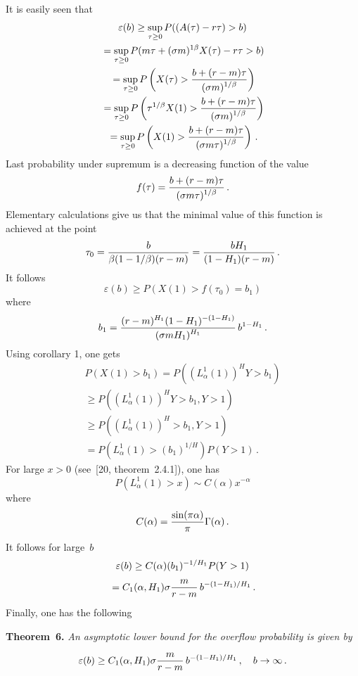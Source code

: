 \begin{multicols}{2}
It is easily seen that 
\begin{multline*}
\varepsilon (b) \geq 
\sup\limits_{\tau\geq 0} P( (A(\tau ) - r\tau ) > b ) \\
{}=
\sup\limits_{\tau\geq 0} P( m\tau +(\sigma m )^{1\/\beta} X(\tau ) - r\tau  > b )\\
{}=
\sup\limits_{\tau\geq 0} P\left( X(\tau ) > 
\displaystyle\frac{\displaystyle b+(r-m)\tau\mathstrut}{\displaystyle (\sigma m)^{1/\beta}\mathstrut}\right ) \\
{}=
\sup\limits_{\tau\geq 0} P\left( \tau^{1/\beta} X(1) > 
\displaystyle\frac{\displaystyle b+(r-m)\tau\mathstrut}{\displaystyle (\sigma m)^{1/\beta}\mathstrut}\right ) \\
{}=
\sup\limits_{\tau\geq 0} P\left( X(1) > 
\displaystyle\frac{\displaystyle b+(r-m)\tau\mathstrut}{\displaystyle (\sigma m \tau )^{1/\beta}\mathstrut}\right ) \,. 
\end{multline*}
Last probability under supremum is a decreasing function of the value 
$$
f(\tau ) = \displaystyle\frac{\displaystyle b+(r-m)\tau\mathstrut}{\displaystyle (\sigma m \tau )^{1/\beta}\mathstrut}\,.
$$
Elementary calculations give us that the minimal value of this function is achieved at the 
point 
$$
\tau_0 = \displaystyle\frac{\displaystyle b\mathstrut}{\displaystyle \beta (1-1/\beta )(r-m)\mathstrut} = \displaystyle\frac{\displaystyle b H_1\mathstrut}{\displaystyle (1-H_1 ) (r-m)\mathstrut} \,. 
$$
It follows 
$$
\varepsilon (b) \geq P(X(1) > f(\tau_0 ) = b_1 ) 
$$ 
where 
$$
b_1 = \displaystyle\frac{\displaystyle (r-m)^{H_1} (1-H_1 )^{-(1-H_1 )} \mathstrut}{\displaystyle (\sigma m H_1 )^{H_1 } \mathstrut} \, b^{1-H_1} \,. 
$$
Using corollary 1, one gets 
\begin{multline*}
P(X(1) > b_1 ) = P((L_{\alpha}^1 (1))^H Y >b_1 ) \\
{}\geq  
P((L_{\alpha}^1 (1))^H Y >b_1 , Y>1) \\
{}\geq
P((L_{\alpha}^1 (1))^H >b_1 , Y>1)\\ = P(L_{\alpha}^1 (1) 
>(b_1 )^{1/H} ) P(Y>1) \,. 
\end{multline*}
For large $x>0$ (see~[20, theorem~2.4.1]), one has 
$$
 P(L_{\alpha}^1 (1) > x ) \sim C(\alpha ) x^{-\alpha} 
$$
where 
$$
C(\alpha ) = \displaystyle\frac{\displaystyle \sin (\pi\alpha )\mathstrut}{\displaystyle \pi\mathstrut} \Gamma (\alpha )\,.
$$
It follows for large~$b$ 
\begin{multline*}
\varepsilon (b) \geq C(\alpha ) (b_1 )^{-1/H_1} P(Y>1)\\
{}=
C_1 (\alpha , H_1 )\sigma \displaystyle\frac{\displaystyle m\mathstrut}{\displaystyle r-m\mathstrut} \, b^{-({1-H_1})/H_1} \,.
\end{multline*}
Finally, one has the following 

\pagebreak

\smallskip

\noindent
\textbf{Theorem~6.} \textit{An asymptotic lower bound for the overflow probability is given by}
$$
\varepsilon (b) \geq
C_1 (\alpha , H_1 )\sigma \displaystyle\frac{\displaystyle m\mathstrut}{\displaystyle r-m\mathstrut} \, b^{-({1-H_1})/{H_1} } \,, \quad
b\to\infty \,.
$$


\end{multicols}
